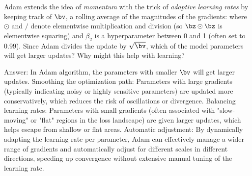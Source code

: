 \begin{parts}
\begin{subparts}
            \subpart[2] Adam extends the idea of {\it momentum} with the trick of {\it adaptive learning rates} by keeping track of  $\bv$, a rolling average of the magnitudes of the gradients:
                where $\odot$ and $/$ denote elementwise multiplication and division (so $\bz \odot \bz$ is elementwise squaring) and $\beta_2$ is a hyperparameter between 0 and 1 (often set to  0.99). Since Adam divides the update by $\sqrt{\bv}$, which of the model parameters will get larger updates?  Why might this help with learning?
                
           \begin{shaded}
           Answer: In Adam algorithm, the parameters with smaller $\bv$ will get larger updates. 
           Smoothing the optimization path: Parameters with large gradients (typically indicating noisy or highly sensitive parameters) are updated more conservatively, which reduces the risk of oscillations or divergence.
           Balancing learning rates: Parameters with small gradients (often associated with "slow-moving" or "flat" regions in the loss landscape) are given larger updates, which helps escape from shallow or flat areas.
           Automatic adjustment: By dynamically adapting the learning rate per parameter, Adam can effectively manage a wider range of gradients and automatically adjust for different scales in different directions, speeding up convergence without extensive manual tuning of the learning rate.
           \end{shaded}
                
                \end{subparts}
        
        

\end{parts}
